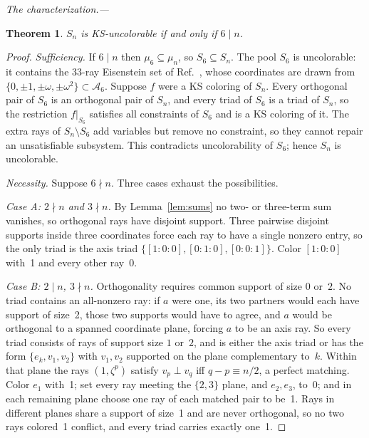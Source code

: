 \documentclass[twocolumn,prl,superscriptaddress,nofootinbib]{revtex4-2}
\newtheorem{theorem}{Theorem}
\begin{document}
\textit{The characterization.---}

\begin{theorem}\label{thm:6n}
$S_n$ is KS-uncolorable if and only if $6 \mid n$.
\end{theorem}

\begin{proof}
\emph{Sufficiency.}  If $6\mid n$ then $\mu_6\subseteq\mu_n$, so
$S_6\subseteq S_n$.  The pool $S_6$ is uncolorable: it contains the 33-ray
Eisenstein set of Ref.~\cite{Cabello2025simplest}, whose coordinates are drawn
from $\{0,\pm1,\pm\omega,\pm\omega^2\}\subset\mathcal{A}_6$.  Suppose $f$ were a
KS coloring of $S_n$.  Every orthogonal pair of $S_6$ is an orthogonal pair of
$S_n$, and every triad of $S_6$ is a triad of $S_n$, so the restriction
$f|_{S_6}$ satisfies all constraints of $S_6$ and is a KS coloring of it.  The
extra rays of $S_n\setminus S_6$ add variables but remove no constraint, so they
cannot repair an unsatisfiable subsystem.  This contradicts uncolorability of
$S_6$; hence $S_n$ is uncolorable.

\emph{Necessity.}  Suppose $6\nmid n$.  Three cases exhaust the possibilities.

\emph{Case A: $2\nmid n$ and $3\nmid n$.}  By Lemma~\ref{lem:sums} no two- or
three-term sum vanishes, so orthogonal rays have disjoint support.  Three
pairwise disjoint supports inside three coordinates force each ray to have a
single nonzero entry, so the only triad is the axis triad
$\{[1{:}0{:}0],[0{:}1{:}0],[0{:}0{:}1]\}$.  Color $[1{:}0{:}0]$ with~1 and every
other ray~0.

\emph{Case B: $2\mid n$, $3\nmid n$.}  Orthogonality requires common support of
size $0$ or~$2$.  No triad contains an all-nonzero ray: if $a$ were one, its two
partners would each have support of size~2, those two supports would have to
agree, and $a$ would be orthogonal to a spanned coordinate plane, forcing $a$ to
be an axis ray.  So every triad consists of rays of support size $1$ or~$2$,
and is either the axis triad or has the form $\{e_k,v_1,v_2\}$ with $v_1,v_2$
supported on the plane complementary to~$k$.  Within that plane the rays
$(1,\zeta^p)$ satisfy $v_p\perp v_q$ iff $q-p\equiv n/2$, a perfect matching.
Color $e_1$ with~1; set every ray meeting the $\{2,3\}$ plane, and $e_2,e_3$,
to~0; and in each remaining plane choose one ray of each matched pair to be~1.
Rays in different planes share a support of size~1 and are never orthogonal, so
no two rays colored~1 conflict, and every triad carries exactly one~1.


\end{proof}
\end{document}
